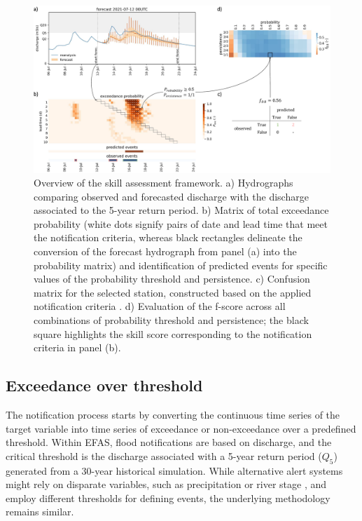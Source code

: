 \documentclass[preprint,12pt,authoryear]{elsarticle}
\begin{document}
\begin{figure}
    \centering
    \includegraphics[width=1\linewidth]{figures/study_layout.pdf}
    \caption{Overview of the skill assessment framework. a) Hydrographs comparing observed and forecasted discharge with the discharge associated to the 5-year return period. b) Matrix of total exceedance probability (white dots signify pairs of date and lead time that meet the notification criteria, whereas black rectangles delineate the conversion of the forecast hydrograph from panel (a) into the probability matrix) and identification of predicted events for specific values of the probability threshold and persistence. c) Confusion matrix for the selected station, constructed based on the applied notification criteria . d) Evaluation of the f-score across all combinations of probability threshold and persistence; the black square highlights the skill score corresponding to the notification criteria in panel (b).}
    \label{fig:scheme}
\end{figure}

\subsection{Exceedance over threshold}
\label{sec:methods_exceedance}

The notification process starts by converting the continuous time series of the target variable into time series of exceedance or non-exceedance over a predefined threshold. Within EFAS, flood notifications are based on discharge, and the critical threshold is the discharge associated with a 5-year return period ($Q_5$) generated from a 30-year historical simulation. While alternative alert systems might rely on disparate variables, such as precipitation \cite{Bouttier2023} or river stage \cite{Nevo2022}, and employ different thresholds for defining events, the underlying methodology remains similar. 
\end{document}
